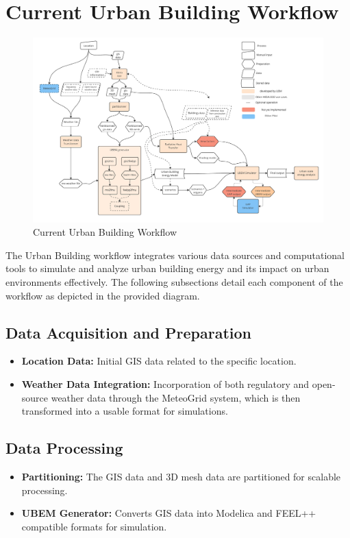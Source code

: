 \documentclass[runningheads]{llncs}
\begin{document}
\section{Current Urban Building Workflow}

\begin{figure}
    \centering
    \includegraphics[width=.9\textwidth]{images/kub-workflow.pdf}
    \caption{Current Urban Building Workflow}
    \label{fig:ub_workflow}
\end{figure}

The Urban Building workflow integrates various data sources and computational tools to simulate and analyze urban building energy and its impact on urban environments effectively. The following subsections detail each component of the workflow as depicted in the provided diagram.

\subsection{Data Acquisition and Preparation}
\begin{itemize}
    \item \textbf{Location Data:} Initial GIS data related to the specific location.
    \item \textbf{Weather Data Integration:} Incorporation of both regulatory and open-source weather data through the MeteoGrid system, which is then transformed into a usable format for simulations.
\end{itemize}

\subsection{Data Processing}
\begin{itemize}
    \item \textbf{Partitioning:} The GIS data and 3D mesh data are partitioned for scalable processing.
    \item \textbf{UBEM Generator:} Converts GIS data into Modelica and FEEL++ compatible formats for simulation.
\end{itemize}
\end{document}
